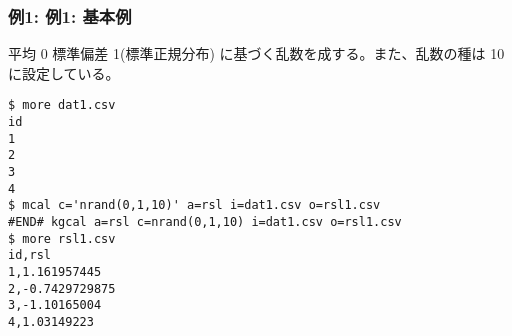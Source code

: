 \subsubsection*{例1: 例1: 基本例}

平均 0 標準偏差 1(標準正規分布) に基づく乱数を成する。また、乱数の種は 10 に設定している。


\begin{Verbatim}[baselinestretch=0.7,frame=single]
$ more dat1.csv
id
1
2
3
4
$ mcal c='nrand(0,1,10)' a=rsl i=dat1.csv o=rsl1.csv
#END# kgcal a=rsl c=nrand(0,1,10) i=dat1.csv o=rsl1.csv
$ more rsl1.csv
id,rsl
1,1.161957445
2,-0.7429729875
3,-1.10165004
4,1.03149223
\end{Verbatim}
